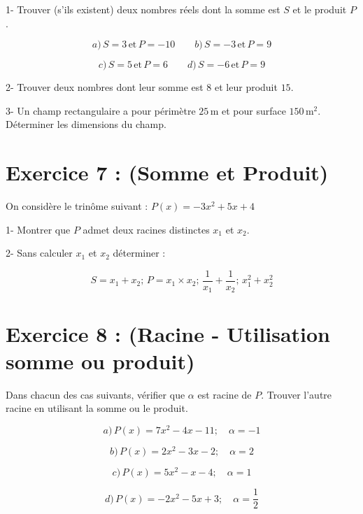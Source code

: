\documentclass[12pt]{article}
\begin{document}
1- Trouver (s’ils existent) deux nombres réels dont la somme est \( S \) et le produit \( P \).

\[
a) \, S = 3 \, \text{et} \, P = -10 \quad\quad b) \, S = -3 \, \text{et} \, P = 9
\]

\[
c) \, S = 5 \, \text{et} \, P = 6 \quad\quad d) \, S = -6 \, \text{et} \, P = 9
\]

2- Trouver deux nombres dont leur somme est \( 8 \) et leur produit \( 15 \).

3- Un champ rectangulaire a pour périmètre \( 25 \, \text{m} \) et pour surface \( 150 \, \text{m}^2 \). Déterminer les dimensions du champ.

\section*{Exercice 7 : (Somme et Produit)}

On considère le trinôme suivant : \( P(x) = -3x^2 + 5x + 4 \)

1- Montrer que \( P \) admet deux racines distinctes \( x_1 \) et \( x_2 \).

2- Sans calculer \( x_1 \) et \( x_2 \) déterminer :

\[
S = x_1 + x_2 ; \, P = x_1 \times x_2 ; \, \frac{1}{x_1} + \frac{1}{x_2} ; \, x_1^2 + x_2^2
\]

\section*{Exercice 8 : (Racine - Utilisation somme ou produit)}

Dans chacun des cas suivants, vérifier que \( \alpha \) est racine de \( P \). Trouver l’autre racine en utilisant la somme ou le produit.

\[
a) \, P(x) = 7x^2 - 4x - 11 ; \quad \alpha = -1
\]

\[
b) \, P(x) = 2x^2 - 3x - 2 ; \quad \alpha = 2
\]

\[
c) \, P(x) = 5x^2 - x - 4 ; \quad \alpha = 1
\]

\[
d) \, P(x) = -2x^2 - 5x + 3 ; \quad \alpha = \frac{1}{2}
\]
\end{document}
